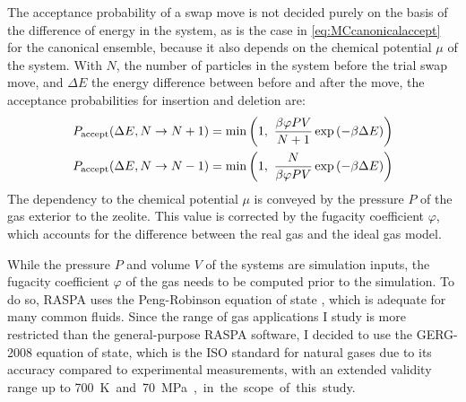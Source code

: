 \documentclass[main.tex]{subfiles}
\begin{document}
The acceptance probability of a swap move is not decided purely on the basis of the difference of energy in the system, as is the case in \cref{eq:MCcanonicalaccept} for the canonical ensemble, because it also depends on the chemical potential $\mu$ of the system. With $N$, the number of particles in the system before the trial swap move, and $\Delta E$ the energy difference between before and after the move, the acceptance probabilities for insertion and deletion are:
\[\begin{split}
	P_\text{accept}(\Delta E, N\to N+1) &= \min\paren{1,\ \frac{\beta\varphi P V}{N+1}\exp\paren{-\beta\Delta E}}\\
	P_\text{accept}(\Delta E, N\to N-1) &= \min\paren{1,\ \frac{N}{\beta\varphi P V}\exp\paren{-\beta\Delta E}}
\end{split}\]
The dependency to the chemical potential $\mu$ is conveyed by the pressure $P$ of the gas exterior to the zeolite. This value is corrected by the fugacity coefficient $\varphi$, which accounts for the difference between the real gas and the ideal gas model.

While the pressure $P$ and volume $V$ of the systems are simulation inputs, the fugacity coefficient $\varphi$ of the gas needs to be computed prior to the simulation. To do so, RASPA uses the Peng-Robinson equation of state \autocite{PengRobinson}, which is adequate for many common fluids. Since the range of gas applications I study is more restricted than the general-purpose RASPA software, I decided to use the GERG-2008 \autocite{GERG2008} equation of state, which is the ISO standard for natural gases due to its accuracy compared to experimental measurements, with an extended validity range up to \qty{700}K and \qty{70}{MPa}, in the scope of this study.
\end{document}
